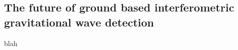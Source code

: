 \subsection{The future of ground based interferometric gravitational wave detection}\label{subsec:future}

blah